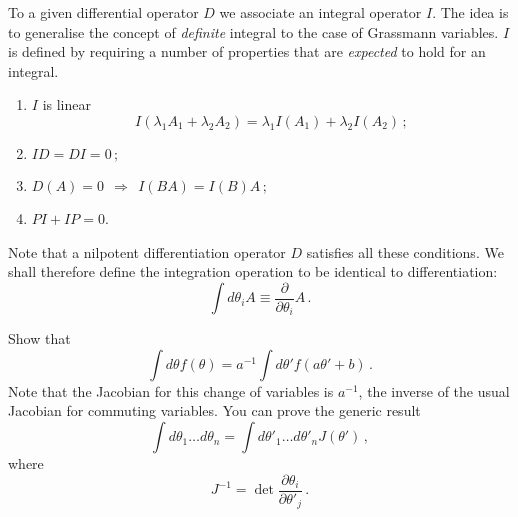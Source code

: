 \begin{subappendices}
To a given differential operator $D$ we associate an integral
operator $I$. The idea is to generalise the concept of {\em definite}
integral to the case of Grassmann variables. $I$ is defined by
requiring a number of properties that are {\em expected} to hold for
an integral. 
\begin{enumerate}
\item $I$ is linear
  \begin{equation}
    \label{eq:LinearGrassInt}
    I(\lambda_1 A_1 + \lambda_2 A_2) = 
    \lambda_1 I(A_1) + \lambda_2 I(A_2)\, ;
  \end{equation}
\item $I D = D I = 0\, ;$
\item $D(A) = 0 ~~\Longrightarrow~~ I(BA) = I(B) A\, ;$
\item $P I + I P = 0$.
\end{enumerate}
Note that a nilpotent differentiation operator $D$ satisfies all these
conditions. We shall therefore define the integration operation to be
identical to differentiation:
\begin{equation}
  \label{eq:GrassIntDef}
  \int d\theta_i A \equiv \frac{\partial}{\partial\theta_i} A\, .
\end{equation}

Show that 
\begin{equation}
  \label{eq:GrassJacob}
  \int d\theta f(\theta) = a^{-1} \int d\theta' f(a \theta' + b)\, .
\end{equation}
Note that the Jacobian for this change of variables is $a^{-1}$, \ie
the inverse of the usual Jacobian for commuting variables. You can
prove the generic result
\begin{equation}
  \label{eq:GrassJacobOne}
  \int d\theta_1 \ldots d\theta_n = 
  \int d\theta'_1 \ldots d\theta'_n J(\theta')\, , 
\end{equation}
where 
\begin{equation}
  \label{eq:GrassJacobTwo}
  J^{-1} = \det \frac{\partial \theta_i}{\partial \theta'_j}\, .
\end{equation}

\end{subappendices}

